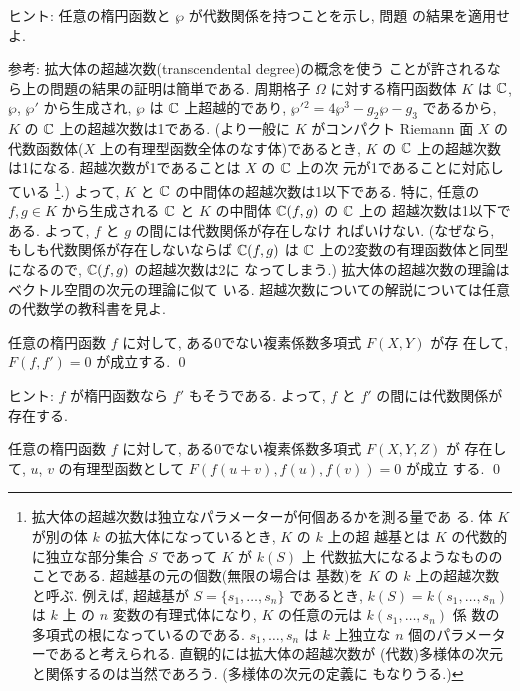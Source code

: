 \documentclass[12pt,twoside]{jarticle}
\def\pe{\wp}
\def\C{{\Bbb C}} %
\begin{document}
\noindent ヒント: 任意の楕円函数と $\pe$ が代数関係を持つことを示し, 
問題  の結果を適用せよ.

\medskip

\noindent 参考: 拡大体の超越次数(transcendental degree)の概念を使う
ことが許されるなら上の問題の結果の証明は簡単である. 周期格子 $\Omega$ 
に対する楕円函数体 $K$ は $\C$, $\pe$, $\pe'$ から生成され, $\pe$ は
$\C$ 上超越的であり, $\pe'{}^2=4\pe^3-g_2\pe-g_3$ であるから, $K$ の %
$\C$ 上の超越次数は1である. (より一般に $K$ がコンパクト Riemann 面 %
$X$ の代数函数体($X$ 上の有理型函数全体のなす体)であるとき, $K$ の %
$\C$ 上の超越次数は1になる. 超越次数が1であることは $X$ の $\C$ 上の次
元が1であることに対応している%
\footnote{拡大体の超越次数は独立なパラメーターが何個あるかを測る量であ
  る. 体 $K$ が別の体 $k$ の拡大体になっているとき, $K$ の $k$ 上の超
  越基とは $K$ の代数的に独立な部分集合 $S$ であって $K$ が $k(S)$ 上
  代数拡大になるようなもののことである. 超越基の元の個数(無限の場合は
  基数)を $K$ の $k$ 上の超越次数と呼ぶ. 例えば, 超越基が %
  $S=\{s_1,\dots,s_n\}$ であるとき, $k(S)=k(s_1,\dots,s_n)$ は $k$ 上
  の $n$ 変数の有理式体になり, $K$ の任意の元は $k(s_1,\dots,s_n)$ 係
  数の多項式の根になっているのである. $s_1,\dots,s_n$ は $k$ 上独立な 
  $n$ 個のパラメーターであると考えられる. 直観的には拡大体の超越次数が
  (代数)多様体の次元と関係するのは当然であろう. (多様体の次元の定義に
  もなりうる.)}.)
よって, $K$ と $\C$ の中間体の超越次数は1以下である. 特に, 任意の %
$f,g\in K$ から生成される $\C$ と $K$ の中間体 $\C(f,g)$ の $\C$ 上の
超越次数は1以下である. よって, $f$ と $g$ の間には代数関係が存在しなけ
ればいけない. (なぜなら, もしも代数関係が存在しないならば $\C(f,g)$ は %
$\C$ 上の2変数の有理函数体と同型になるので, $\C(f,g)$ の超越次数は2に
なってしまう.) 拡大体の超越次数の理論はベクトル空間の次元の理論に似て
いる. 超越次数についての解説については任意の代数学の教科書を見よ.

\begin{question}[楕円函数が微分方程式を満たすこと]
  任意の楕円函数 $f$ に対して, ある0でない複素係数多項式 $F(X,Y)$ が存
  在して, $F(f,f')=0$ が成立する. \qed
\end{question}

\noindent ヒント: $f$ が楕円函数なら $f'$ もそうである. よって, $f$ 
と $f'$ の間には代数関係が存在する.

\begin{question}[楕円函数の代数的加法性]
  任意の楕円函数 $f$ に対して, ある0でない複素係数多項式 $F(X,Y,Z)$ が
  存在して, $u$, $v$ の有理型函数として $F(f(u+v),f(u),f(v))=0$ が成立
  する. \qed
\end{question}
\end{document}
